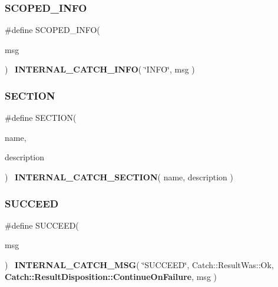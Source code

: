 \mbox{\label{catch_8hpp_a35fb0dbec68e4116010eb55d4e1aed42}} 
\subsubsection{S\+C\+O\+P\+E\+D\+\_\+\+I\+N\+FO}
{\footnotesize\ttfamily \#define S\+C\+O\+P\+E\+D\+\_\+\+I\+N\+FO(\begin{DoxyParamCaption}\item[{}]{msg }\end{DoxyParamCaption})~\textbf{ I\+N\+T\+E\+R\+N\+A\+L\+\_\+\+C\+A\+T\+C\+H\+\_\+\+I\+N\+FO}( \char`\"{}I\+N\+FO\char`\"{}, msg )}

\mbox{\label{catch_8hpp_afcb669b40babf8726c969fce8d2cd94b}} 
\subsubsection{S\+E\+C\+T\+I\+ON}
{\footnotesize\ttfamily \#define S\+E\+C\+T\+I\+ON(\begin{DoxyParamCaption}\item[{}]{name,  }\item[{}]{description }\end{DoxyParamCaption})~\textbf{ I\+N\+T\+E\+R\+N\+A\+L\+\_\+\+C\+A\+T\+C\+H\+\_\+\+S\+E\+C\+T\+I\+ON}( name, description )}

\mbox{\label{catch_8hpp_a3d0d5d38dd75c7ffebcc8c6e1e03d2ce}} 
\subsubsection{S\+U\+C\+C\+E\+ED}
{\footnotesize\ttfamily \#define S\+U\+C\+C\+E\+ED(\begin{DoxyParamCaption}\item[{}]{msg }\end{DoxyParamCaption})~\textbf{ I\+N\+T\+E\+R\+N\+A\+L\+\_\+\+C\+A\+T\+C\+H\+\_\+\+M\+SG}( \char`\"{}S\+U\+C\+C\+E\+ED\char`\"{}, Catch\+::\+Result\+Was\+::\+Ok, \textbf{ Catch\+::\+Result\+Disposition\+::\+Continue\+On\+Failure}, msg )}

